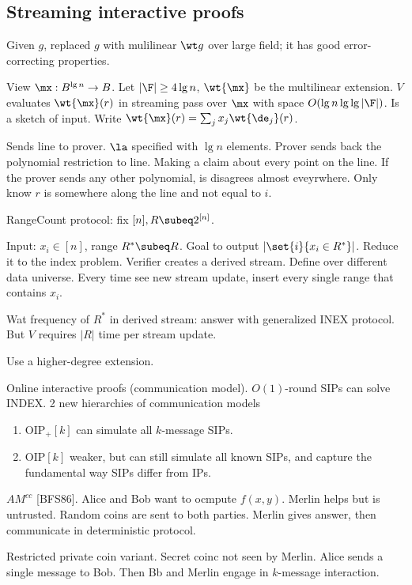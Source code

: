 \subsection{Streaming interactive proofs}

Given $g$, replaced $g$ with mulilinear $\wt g$ over large field; it has good error-correcting properties.

View $\mx:B^{\lg n}\to B$. Let $|\F|\ge 4\lg n$, $\wt{\mx}$ be the multilinear extension. $V$ evaluates $\wt{\mx}(r)$ in streaming pass over $\mx$ with space $O(\lg n\lg\lg |\F|)$. Is a sketch of input. Write $\wt{\mx}(r)=\sum_j x_j\wt{\de_j}(r)$.

Sends line to prover. $\la$ specified with $\lg n$ elements. Prover sends back the polynomial restriction to line. Making a claim about every point on the line.
If the prover sends any other polynomial, %
is disagrees almost eveyrwhere.
Only know $r$ is somewhere along the line and not equal to $i$.

RangeCount protocol: fix $[n], R\subeq 2^{[n]}$.

Input: $x_i\in [n]$, range $R^*\subeq R$. Goal to output $|\set{i}{x_i\in R^*}|$. Reduce it to the index problem. Verifier creates a derived stream. Define over different data universe. Every time see new stream update, insert every single range that contains $x_i$. 

Wat frequency of $R^*$ in derived stream: answer with generalized INEX protocol. But $V$ requires $|R|$ time per stream update.

Use a higher-degree extension.

Online interactive proofs (communication model).
$O(1)$-round SIPs can solve INDEX. 
2 new hierarchies of communication models
\begin{enumerate}
\item
OIP${}_+[k]$ can simulate all $k$-message SIPs. 
\item
OIP$[k]$ weaker, but can still simulate all known SIPs, and capture the fundamental way SIPs differ from IPs.
\end{enumerate}

$AM^{cc}$ [BFS86]. Alice and Bob want to ocmpute $f(x,y)$. Merlin helps but is untrusted. Random coins are sent to both parties. Merlin gives answer, then communicate in deterministic protocol.

Restricted private coin variant. Secret coinc not seen by Merlin. Alice sends a single message to Bob. Then Bb and Merlin engage in $k$-message interaction.

